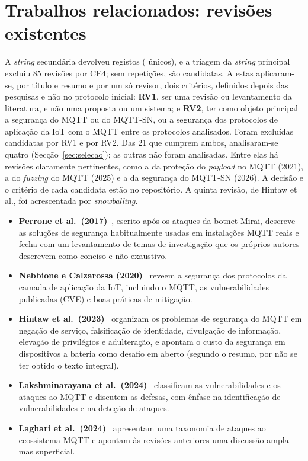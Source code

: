 \section{Trabalhos relacionados: revisões existentes}
\label{sec:relacionados}

A \emph{string} secundária devolveu \nSecundariaTotal{} registos
(\nSecundariaUnicos{} únicos), e a triagem da \emph{string} principal excluiu 85
revisões por CE4; sem repetições, são \nRevCandidatas{} candidatas. A estas
aplicaram-se, por título e resumo e por um só revisor, dois critérios, definidos
depois das pesquisas e não no protocolo inicial:
\textbf{RV1}, ser uma revisão ou levantamento da literatura, e não uma proposta ou
um sistema; e \textbf{RV2}, ter como objeto principal a segurança do MQTT ou do
MQTT-SN, ou a segurança dos protocolos de aplicação da IoT com o MQTT entre os
protocolos analisados. Foram excluídas \nRevNaoRevisao{} candidatas por RV1 e
\nRevForaObjeto{} por RV2. Das 21 que cumprem ambos, analisaram-se quatro
(Secção~\ref{sec:selecao}); as outras \nRevElegiveisNaoAnalisadas{} não foram
analisadas. Entre elas
há revisões claramente pertinentes, como a da proteção do \emph{payload} no MQTT
(2021), a do \emph{fuzzing} do MQTT (2025) e a da segurança do MQTT-SN (2026). A
decisão e o critério de cada candidata estão no repositório. A quinta revisão, de
Hintaw et al., foi acrescentada por \emph{snowballing}.

\begin{itemize}[leftmargin=*]
  \item \textbf{Perrone et al.\ (2017)}~\cite{perrone2017mirai}, escrito após os
    ataques da botnet Mirai, descreve as soluções de segurança habitualmente usadas
    em instalações MQTT reais e fecha com um levantamento de temas de investigação
    que os próprios autores descrevem como conciso e não exaustivo.
  \item \textbf{Nebbione e Calzarossa (2020)}~\cite{nebbione2020security} reveem a
    segurança dos protocolos da camada de aplicação da IoT, incluindo o MQTT, as
    vulnerabilidades publicadas (CVE) e boas práticas de mitigação.
  \item \textbf{Hintaw et al.\ (2023)}~\cite{hintaw2023mqtt} organizam os problemas
    de segurança do MQTT em negação de serviço, falsificação de identidade,
    divulgação de informação, elevação de privilégios e adulteração, e apontam o
    custo da segurança em dispositivos a bateria como desafio em aberto (segundo o
    resumo, por não se ter obtido o texto integral).
  \item \textbf{Lakshminarayana et al.\ (2024)}~\cite{lakshminarayana2024securing}
    classificam as vulnerabilidades e os ataques ao MQTT e discutem as defesas, com
    ênfase na identificação de vulnerabilidades e na deteção de ataques.
  \item \textbf{Laghari et al.\ (2024)}~\cite{laghari2024securing} apresentam uma
    taxonomia de ataques ao ecossistema MQTT e apontam às revisões anteriores uma
    discussão ampla mas superficial.
\end{itemize}

